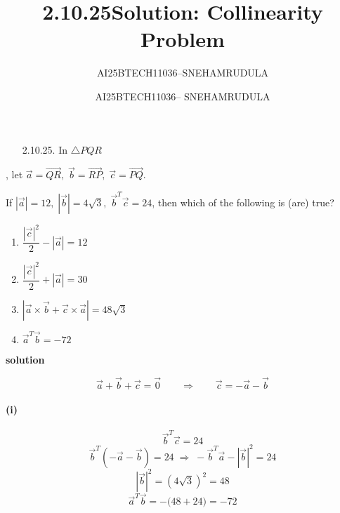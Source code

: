 \documentclass[journal]{IEEEtran}
\begin{document}

\vspace{3cm}
\title{2.10.25}
\author{AI25BTECH11036--SNEHAMRUDULA}
 \maketitle
{\let\newpage\relax\maketitle}

\renewcommand{\thefigure}{\theenumi}
\renewcommand{\thetable}{\theenumi}
\setlength{\intextsep}{10pt} %


\renewcommand{\thetable}{\theenumi}


\title{Solution: Collinearity Problem}
\author{AI25BTECH11036-- SNEHAMRUDULA}
\date{}


\maketitle
\begin{enumerate}
\item[2.10.25.] In $\triangle PQR$
\end{enumerate}, let 
  $\vec{a} = \overrightarrow{QR}, \; 
   \vec{b} = \overrightarrow{RP}, \; 
   \vec{c} = \overrightarrow{PQ}$.  

  If $|\vec{a}| = 12,\; |\vec{b}| = 4\sqrt{3},\; \vec{b}^T\vec{c} = 24$,  
  then which of the following is (are) true?  

  \begin{enumerate}[label=(\alph*), leftmargin=*]
    \item $\dfrac{|\vec{c}|^2}{2} - |\vec{a}| = 12$
    \item $\dfrac{|\vec{c}|^2}{2} + |\vec{a}| = 30$
    \item $|\vec{a} \times \vec{b} + \vec{c} \times \vec{a}| = 48\sqrt{3}$
    \item $\vec{a}^T\vec{b} = -72$
    \end{enumerate}

\textbf{solution}

\[
\vec a+\vec b+\vec c=\vec0\qquad\Rightarrow\qquad \vec c=-\vec a-\vec b
\]

\paragraph{(i)}
\[
\vec b^{T}\vec c=24
\]
\[
\vec b^{T}(-\vec a-\vec b)=24\;\Rightarrow\; -\vec b^{T}\vec a-|\vec b|^{2}=24
\]
\[
|\vec b|^{2}=(4\sqrt3)^{2}=48
\]
\[
\vec a^{T}\vec b=-\big(48+24\big)=-72
\]
\end{document}
